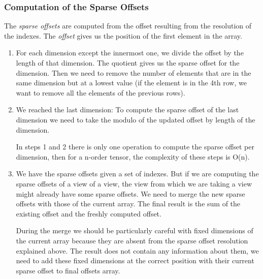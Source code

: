 \subsubsection{Computation of the Sparse Offsets}
\label{sssec:sparseOff}
The \textit{sparse offsets} are computed from the offset resulting from the resolution of the indexes. The \textit{offset} gives us the position of the first element in the array. 


\begin{enumerate}
	\item For each dimension except the innermost one, we divide the offset by the length of that dimension. The quotient gives us the sparse offset for the dimension. Then we need to remove the number of elements that are in the same dimension but at a lowest value (if the element is in the 4th row, we want to remove all the elements of the previous rows).
	
	\item We reached the last dimension: To compute the sparse offset of the last dimension we need to take the modulo of the updated offset by length of the dimension. 
	
	In steps 1 and 2 there is only one operation to compute the sparse offset per dimension, then for a n-order tensor, the complexity of these steps is O(n).
	
	\item We have the sparse offsets given a set of indexes. But if we are computing the sparse offsets of a view of a view, the view from which we are taking a view might already have some sparse offsets. We need to merge the new sparse offsets with those of the current array. The final result is the sum of the existing offset and the freshly computed offset.
		
	During the merge we should be particularly careful with fixed dimensions of the current array because they are absent from the sparse offset resolution explained above. The result does not contain any information about them, we need to add these fixed dimensions at the correct position with their current sparse offset to final offsets array. 

\end{enumerate}

